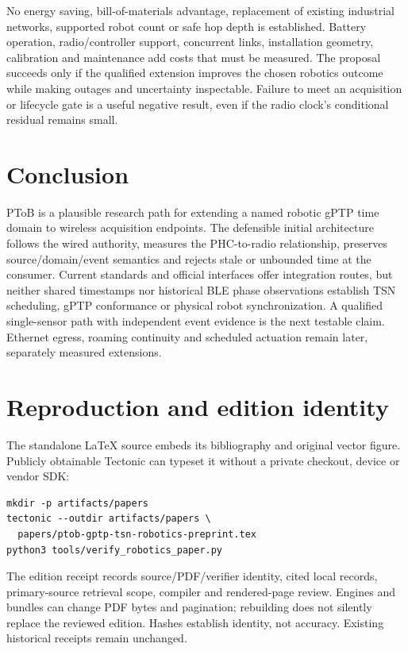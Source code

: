 \documentclass[11pt,letterpaper]{article}
\begin{document}
No energy saving, bill-of-materials advantage, replacement of existing industrial networks, supported robot count or safe hop depth is established. Battery operation, radio/controller support, concurrent links, installation geometry, calibration and maintenance add costs that must be measured. The proposal succeeds only if the qualified extension improves the chosen robotics outcome while making outages and uncertainty inspectable. Failure to meet an acquisition or lifecycle gate is a useful negative result, even if the radio clock's conditional residual remains small.

\section{Conclusion}
PToB is a plausible research path for extending a named robotic gPTP time domain to wireless acquisition endpoints. The defensible initial architecture follows the wired authority, measures the PHC-to-radio relationship, preserves source/domain/event semantics and rejects stale or unbounded time at the consumer. Current standards and official interfaces offer integration routes, but neither shared timestamps nor historical BLE phase observations establish TSN scheduling, gPTP conformance or physical robot synchronization. A qualified single-sensor path with independent event evidence is the next testable claim. Ethernet egress, roaming continuity and scheduled actuation remain later, separately measured extensions.

\appendix
\section{Reproduction and edition identity}
The standalone LaTeX source embeds its bibliography and original vector figure. Publicly obtainable Tectonic can typeset it without a private checkout, device or vendor SDK:
\begin{verbatim}
mkdir -p artifacts/papers
tectonic --outdir artifacts/papers \
  papers/ptob-gptp-tsn-robotics-preprint.tex
python3 tools/verify_robotics_paper.py
\end{verbatim}
The edition receipt  records source/PDF/verifier identity, cited local records, primary-source retrieval scope, compiler and rendered-page review. Engines and bundles can change PDF bytes and pagination; rebuilding does not silently replace the reviewed edition. Hashes establish identity, not accuracy. Existing historical receipts remain unchanged.
\end{document}
